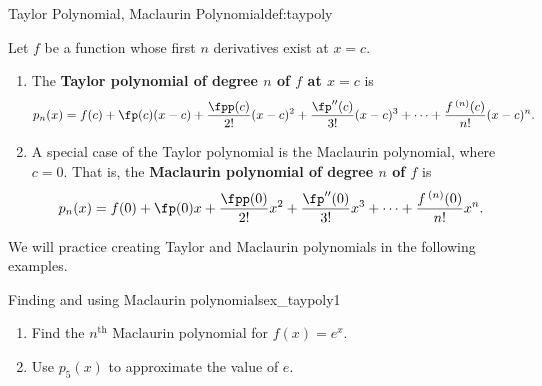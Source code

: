 \begin{definition}{Taylor Polynomial, Maclaurin Polynomial}{def:taypoly}
{Let $f$ be a function whose first $n$ derivatives exist at $x=c$.
 
\begin{enumerate}
\item		The \textbf{Taylor polynomial of degree $n$ of $f$ at $x=c$} is 
				{$$p_n(x) = f(c) + \fp(c)(x-c) + \frac{\fpp(c)}{2!}(x-c)^2+\frac{\fp''(c)}{3!}(x-c)^3+\cdots+\frac{f\,^{(n)}(c)}{n!}(x-c)^n.$$}

\item		A special case of the Taylor polynomial is the Maclaurin polynomial, where $c=0$. That is, the \textbf{Maclaurin polynomial of degree $n$ of $f$} is 
{$$p_n(x) = f(0) + \fp(0)x + \frac{\fpp(0)}{2!}x^2+\frac{\fp''(0)}{3!}x^3+\cdots+\frac{f\,^{(n)}(0)}{n!}x^n.$$}

\end{enumerate}
}
\end{definition}


We will practice creating Taylor and Maclaurin polynomials in the following examples.\\


\begin{example}{Finding and using Maclaurin polynomials}{ex_taypoly1}{
\begin{enumerate}
\item		Find the $n^\text{th}$ Maclaurin polynomial for $f(x) = e^x$.
\item		Use $p_5(x)$ to approximate the value of $e$.
\end{enumerate}
}
\end{example}


